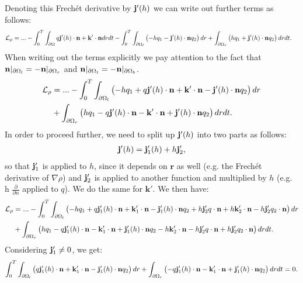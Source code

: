 	Denoting this Frech\'et derivative by $\mathbf j'(h)$ we can write out further terms as follows:
	\begin{align*}
		\mathcal{L}_\rho &= ... - \int_0^T \int_{\partial \Omega} q \mathbf j'(h)   \cdot \mathbf{n} + \mathbf{k}' \cdot \mathbf{n} dr dt - \int_0^T \int_{\partial \Omega_l} \left(- h q_1 - \mathbf j'(h)  \cdot \mathbf{n} q_2 \right)   dr  + \int_{\partial \Omega_r} \left(h q_1 + \mathbf j'(h)  \cdot \mathbf{n} q_2 \right)   dr dt. 
	\end{align*}
	When writing out the terms explicitly we pay attention to the fact that $\mathbf{n}|_{\partial \Omega_l} = - \mathbf{n}|_{\partial \Omega_r}$ and $\mathbf{n}|_{\partial \Omega_t} = - \mathbf{n}|_{\partial \Omega_b}$.
	\begin{align*}
		\mathcal{L}_\rho &= ... - \int_0^T \int_{\partial \Omega_l} \left(- h q_1 + q \mathbf j'(h)   \cdot \mathbf{n}  + \mathbf{k}' \cdot \mathbf{n}- \mathbf j'(h)  \cdot \mathbf{n} q_2 \right)   dr  \\
		&+ \int_{\partial \Omega_r} \left(h q_1 - q \mathbf j'(h)   \cdot \mathbf{n} - \mathbf{k}' \cdot \mathbf{n}+ \mathbf j'(h)  \cdot \mathbf{n} q_2 \right)   dr dt .
	\end{align*}
	In order to proceed further, we need to split up $\mathbf j'(h)$ into two parts as follows:
	\begin{align*}
		\mathbf j'(h) = \mathbf j'_1(h) + h \mathbf j'_2,
	\end{align*}
	so that $\mathbf j'_1$ is applied to $h$, since it depends on $\mathbf{r}$ as well (e.g. the Frech\'et derivative of $\nabla \rho$) and $\mathbf j'_2$ is applied to another function and multiplied by $h$ (e.g. h $\frac{\partial }{\partial n}$ applied to $q$). We do the same for $\mathbf k'$.
	We then have:
	\begin{align*}
		\mathcal{L}_\rho &= ... - \int_0^T \int_{\partial \Omega_l} \left(- h q_1 + q \mathbf j_1'(h)   \cdot \mathbf{n} + \mathbf{k}_1' \cdot \mathbf{n} - \mathbf j_1'(h)  \cdot \mathbf{n} q_2  + h \mathbf j'_2 q \cdot \mathbf{n} + h \mathbf{k}_2' \cdot \mathbf{n}-  h \mathbf j'_2 q_2 \cdot \mathbf{n} \right)   dr  \\
		&+ \int_{\partial \Omega_r} \left( h q_1 - q \mathbf j_1'(h)   \cdot \mathbf{n} -\mathbf{k}_1' \cdot \mathbf{n}+ \mathbf j_1'(h)  \cdot \mathbf{n} q_2 - h\mathbf{k}_2' \cdot \mathbf{n} - h \mathbf j'_2 q \cdot \mathbf{n} +  h \mathbf j'_2 q_2 \cdot \mathbf{n} \right)   dr dt.
	\end{align*}
	Considering $\mathbf j'_1 \neq 0$, we get:
	\begin{align*}
		\int_0^T \int_{\partial \Omega_l} \left( q \mathbf j_1'(h)   \cdot \mathbf{n}  + \mathbf{k}_1' \cdot \mathbf{n} - \mathbf j_1'(h)  \cdot \mathbf{n} q_2  \right)   dr  + \int_{\partial \Omega_r} \left(-q \mathbf j_1'(h)   \cdot \mathbf{n} - \mathbf{k}_1' \cdot \mathbf{n} + \mathbf j_1'(h)  \cdot \mathbf{n} q_2  \right)   dr dt = 0 .
	\end{align*}

